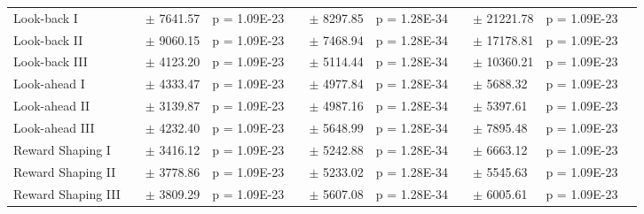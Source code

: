 \documentclass{article}
\begin{document}
\begin{appendices}
\begin{landscape}
\begin{table}[htp]
\begin{center}
\begin{tabular}{*{1}{>{\raggedright}p{14em}}*{1}{>{\raggedleft}p{4em}}*{1}{>{\raggedleft}p{5em}}*{1}{>{\raggedright}p{5em}}*{1}{>{\columncolor{mColor1}\raggedleft}p{4em}}*{1}{>{\columncolor{mColor1}\raggedleft}p{5em}}*{1}{>{\columncolor{mColor1}\raggedright}p{5em}}*{1}{>{\raggedleft}p{4em}}*{1}{>{\raggedleft}p{5em}}*{1}{>{\raggedright}p{5em}}*{1}{>{\raggedright}p{0.01em}}}
\toprule[1pt]
\addlinespace[2pt]
{\bf Method} &\multicolumn{3}{c}{\bf Delay 12} &\multicolumn{3}{c}{\bf Delay 15} &\multicolumn{3}{c}{\bf Delay 17} &\\
\toprule[1pt]
Look-back I & 33082.56 & {\small $\pm$ 7641.57} & {\small p = 1.09E-23} & 49658.86 & {\small $\pm$ 8297.85} & {\small p = 1.28E-34} & 72115.16 & {\small $\pm$ 21221.78} & {\small p = 1.09E-23} &  \\
Look-back II & 23240.16 & {\small $\pm$ 9060.15} & {\small p = 1.09E-23} & 29293.94 & {\small $\pm$ 7468.94} & {\small p = 1.28E-34} & 42639.38 & {\small $\pm$ 17178.81} & {\small p = 1.09E-23} &  \\
Look-back III & 15647.40 & {\small $\pm$ 4123.20} & {\small p = 1.09E-23} & 20478.06 & {\small $\pm$ 5114.44} & {\small p = 1.28E-34} & 26946.92 & {\small $\pm$ 10360.21} & {\small p = 1.09E-23} &  \\
Look-ahead I & 66769.02 & {\small $\pm$ 4333.47} & {\small p = 1.09E-23} & 105336.74 & {\small $\pm$ 4977.84} & {\small p = 1.28E-34} & 136660.12 & {\small $\pm$ 5688.32} & {\small p = 1.09E-23} &  \\
Look-ahead II & 62220.56 & {\small $\pm$ 3139.87} & {\small p = 1.09E-23} & 100505.05 & {\small $\pm$ 4987.16} & {\small p = 1.28E-34} & 130271.88 & {\small $\pm$ 5397.61} & {\small p = 1.09E-23} &  \\
Look-ahead III & 72804.44 & {\small $\pm$ 4232.40} & {\small p = 1.09E-23} & 115616.59 & {\small $\pm$ 5648.99} & {\small p = 1.28E-34} & 149064.68 & {\small $\pm$ 7895.48} & {\small p = 1.09E-23} &  \\
Reward Shaping I & 68428.04 & {\small $\pm$ 3416.12} & {\small p = 1.09E-23} & 107399.17 & {\small $\pm$ 5242.88} & {\small p = 1.28E-34} & 137032.14 & {\small $\pm$ 6663.12} & {\small p = 1.09E-23} &  \\
Reward Shaping II & 56225.24 & {\small $\pm$ 3778.86} & {\small p = 1.09E-23} & 93091.44 & {\small $\pm$ 5233.02} & {\small p = 1.28E-34} & 122224.20 & {\small $\pm$ 5545.63} & {\small p = 1.09E-23} &  \\
Reward Shaping III & 60071.52 & {\small $\pm$ 3809.29} & {\small p = 1.09E-23} & 99476.40 & {\small $\pm$ 5607.08} & {\small p = 1.28E-34} & 130103.50 & {\small $\pm$ 6005.61} & {\small p = 1.09E-23} &  \\

\end{tabular}
\end{center}
\end{table}
\end{landscape}
\end{appendices}
\end{document}
